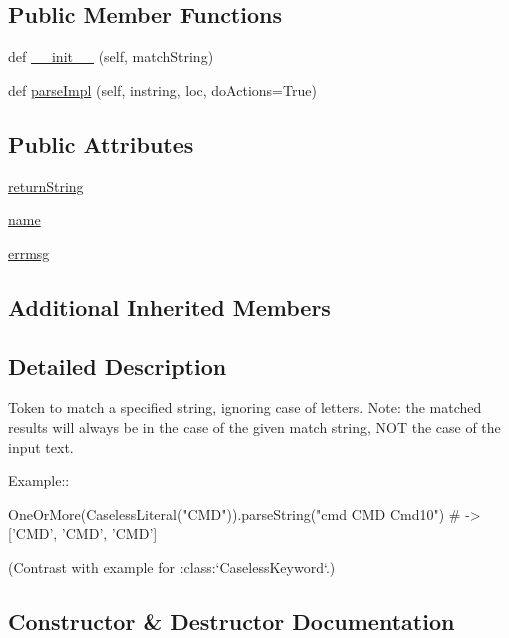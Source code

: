 \subsection*{Public Member Functions}
\begin{DoxyCompactItemize}
\item 
def \hyperlink{classpyparsing_1_1CaselessLiteral_ac262416a8091b62cd3ac521cbfdb794e}{\+\_\+\+\_\+init\+\_\+\+\_\+} (self, match\+String)
\item 
def \hyperlink{classpyparsing_1_1CaselessLiteral_adb4c6e765063910162d230a3b86d5108}{parse\+Impl} (self, instring, loc, do\+Actions=True)
\end{DoxyCompactItemize}
\subsection*{Public Attributes}
\begin{DoxyCompactItemize}
\item 
\hyperlink{classpyparsing_1_1CaselessLiteral_ac2eb3569e6f96068f66bf6e6e179a412}{return\+String}
\item 
\hyperlink{classpyparsing_1_1CaselessLiteral_a1b7504e61962773d0ecd8d03d4471f62}{name}
\item 
\hyperlink{classpyparsing_1_1CaselessLiteral_a87727a9853340009653772b490119080}{errmsg}
\end{DoxyCompactItemize}
\subsection*{Additional Inherited Members}


\subsection{Detailed Description}
\begin{DoxyVerb}Token to match a specified string, ignoring case of letters.
Note: the matched results will always be in the case of the given
match string, NOT the case of the input text.

Example::

    OneOrMore(CaselessLiteral("CMD")).parseString("cmd CMD Cmd10") # -> ['CMD', 'CMD', 'CMD']

(Contrast with example for :class:`CaselessKeyword`.)
\end{DoxyVerb}
 

\subsection{Constructor \& Destructor Documentation}
\mbox{\label{classpyparsing_1_1CaselessLiteral_ac262416a8091b62cd3ac521cbfdb794e}} 
